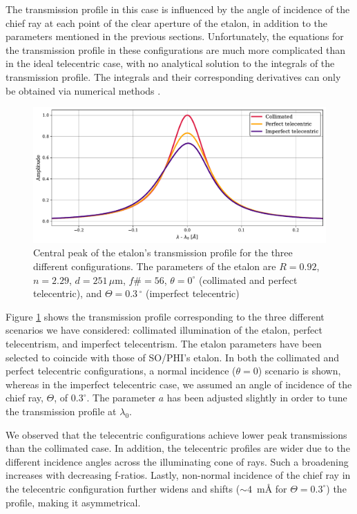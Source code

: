 The transmission profile in this case is influenced by the angle of incidence of the chief ray at each point of the clear aperture of the etalon, in addition to the parameters mentioned in the previous sections. Unfortunately, the equations for the transmission profile in these configurations are much more complicated than in the ideal telecentric case, with no analytical solution to the integrals of the transmission profile. The integrals and their corresponding derivatives can only be obtained via numerical methods \citep{franI}. 
\begin{figure}
    \centering
    \includegraphics[width = \textwidth]{figures/EtalonPaper/etalon_setups_profiles.pdf}
    \caption{Central peak of the etalon's transmission profile for the three different configurations. The parameters of the etalon are $R = 0.92$, $n = 2.29$, $d = 251 \, \mu \mathrm{m}$, $f\#=56$, $\theta = 0 ^{\circ}$ (collimated and perfect telecentric), and $\Theta = 0.3\,^{\circ}$ (imperfect telecentric)}
    \label{fig_etalon:Profiles-configs}
\end{figure}
Figure \ref{fig_etalon:Profiles-configs} shows the transmission profile corresponding to the three different scenarios we have considered: collimated illumination of the etalon, perfect telecentrism, and imperfect telecentrism. The etalon parameters have been selected to coincide with those of SO/PHI's etalon. In both the collimated and perfect telecentric configurations, a normal incidence  ($\theta = 0$) scenario is shown, whereas in the imperfect telecentric case, we assumed an angle of incidence of the chief ray, $\Theta$, of $0.3^{\circ}$. The parameter $a$ has been adjusted slightly in order to tune the transmission profile at $\lambda _ 0$.

We observed that the telecentric configurations achieve lower peak transmissions than the collimated case. In addition, the telecentric profiles are wider due to the different incidence angles across the illuminating cone of rays. Such a broadening increases with decreasing f-ratios. Lastly, non-normal incidence of the chief ray in the telecentric configuration further widens and shifts ($\sim 4$~m\r{A}
for $\Theta=0.3^\circ$) the profile, making it asymmetrical. 

